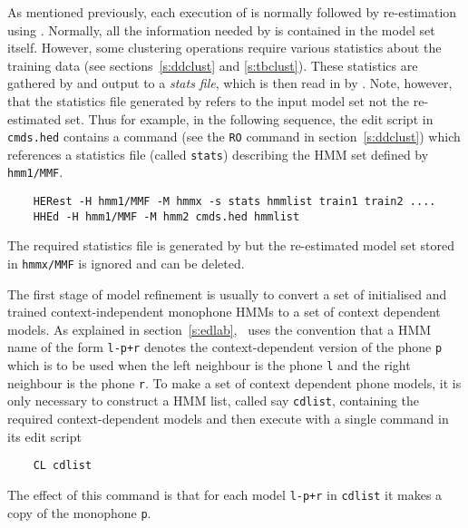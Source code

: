 As mentioned previously, each execution of  is normally followed
by re-estimation using .  Normally, all the information
needed by  is contained in the model set itself.  However,
some clustering operations require various statistics about the
training data (see sections~\ref{s:ddclust} and \ref{s:tbclust}).  
These statistics are gathered by  and 
output to a \textit{stats file}, which is then read in by .
Note, however, that the statistics file 
generated by 
refers to the input model set not the re-estimated set.  Thus
for example, in the following sequence, the  edit script in
\texttt{cmds.hed} contains a command 
(see the \texttt{RO} command 
in section~\ref{s:ddclust})
which references a statistics file  (called \texttt{stats}) 
describing the HMM set defined by \texttt{hmm1/MMF}.
\begin{verbatim}
    HERest -H hmm1/MMF -M hmmx -s stats hmmlist train1 train2 ....
    HHEd -H hmm1/MMF -M hmm2 cmds.hed hmmlist
\end{verbatim}
The required statistics file is generated by   but the re-estimated
model set stored in \texttt{hmmx/MMF} is  ignored and can be deleted.


The first stage of model refinement is usually to convert a set of
initialised and trained context-independent monophone HMMs to a 
set of context dependent models.  As
explained in section~\ref{s:edlab}, \HTK\ uses the convention that a HMM
name of the form \texttt{l-p+r} denotes the context-dependent version of the
phone \texttt{p} which is to be used when the left neighbour is the phone
\texttt{l} and the right neighbour is the phone \texttt{r}.  To make a set
of context dependent phone models, it is only necessary to construct a HMM
list, called say \texttt{cdlist}, containing the required context-dependent models  and
then execute  with a single command in its edit script
\begin{verbatim}
    CL cdlist
\end{verbatim}
The effect of this command is that for each model \texttt{l-p+r} in \texttt{cdlist}
it makes a copy of the monophone \texttt{p}.  

